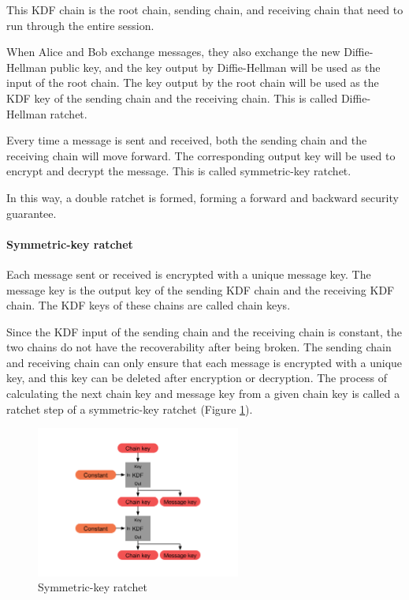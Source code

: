 \documentclass[11pt,en]{elegantpaper}
\begin{document}
This KDF chain is the root chain, sending chain, and receiving chain that need to run through the entire session.

When Alice and Bob exchange messages, they also exchange the new Diffie-Hellman public key, and the key output by Diffie-Hellman will be used as the input of the root chain. The key output by the root chain will be used as the KDF key of the sending chain and the receiving chain. This is called Diffie-Hellman ratchet.

Every time a message is sent and received, both the sending chain and the receiving chain will move forward. The corresponding output key will be used to encrypt and decrypt the message. This is called symmetric-key ratchet.

In this way, a double ratchet is formed, forming a forward and backward security guarantee.

\paragraph{Symmetric-key ratchet}

Each message sent or received is encrypted with a unique message key. The message key is the output key of the sending KDF chain and the receiving KDF chain. The KDF keys of these chains are called chain keys.

Since the KDF input of the sending chain and the receiving chain is constant, the two chains do not have the recoverability after being broken. The sending chain and receiving chain can only ensure that each message is encrypted with a unique key, and this key can be deleted after encryption or decryption. The process of calculating the next chain key and message key from a given chain key is called a ratchet step of a symmetric-key ratchet (Figure \ref{skratchet}).

\begin{figure}[H]
    \centering
    \includegraphics[width=0.6\textwidth]{image/skratchet}
    \caption{Symmetric-key ratchet}
    \label{skratchet}
\end{figure}
\end{document}
